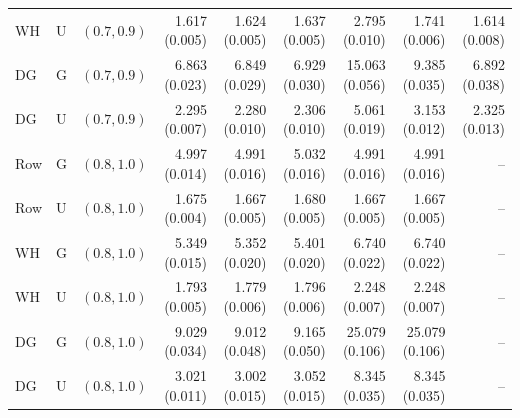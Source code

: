 \begin{tabular}{@{}lllrrrrrr@{}}
WH & U & $(0.7,0.9)$ & 1.617 (0.005) & 1.624 (0.005) & 1.637 (0.005) & 2.795 (0.010) & 1.741 (0.006) & 1.614 (0.008) \\
DG & G & $(0.7,0.9)$ & 6.863 (0.023) & 6.849 (0.029) & 6.929 (0.030) & 15.063 (0.056) & 9.385 (0.035) & 6.892 (0.038) \\
DG & U & $(0.7,0.9)$ & 2.295 (0.007) & 2.280 (0.010) & 2.306 (0.010) & 5.061 (0.019) & 3.153 (0.012) & 2.325 (0.013) \\
\midrule
Row & G & $(0.8,1.0)$ & 4.997 (0.014) & 4.991 (0.016) & 5.032 (0.016) & 4.991 (0.016) & 4.991 (0.016) & -- \\
Row & U & $(0.8,1.0)$ & 1.675 (0.004) & 1.667 (0.005) & 1.680 (0.005) & 1.667 (0.005) & 1.667 (0.005) & -- \\
WH & G & $(0.8,1.0)$ & 5.349 (0.015) & 5.352 (0.020) & 5.401 (0.020) & 6.740 (0.022) & 6.740 (0.022) & -- \\
WH & U & $(0.8,1.0)$ & 1.793 (0.005) & 1.779 (0.006) & 1.796 (0.006) & 2.248 (0.007) & 2.248 (0.007) & -- \\
DG & G & $(0.8,1.0)$ & 9.029 (0.034) & 9.012 (0.048) & 9.165 (0.050) & 25.079 (0.106) & 25.079 (0.106) & -- \\
DG & U & $(0.8,1.0)$ & 3.021 (0.011) & 3.002 (0.015) & 3.052 (0.015) & 8.345 (0.035) & 8.345 (0.035) & -- \\
\bottomrule
\end{tabular}
